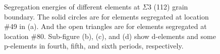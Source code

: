 \begingroup
\begin{figure}[!ht]
  \centering
\caption[Segregation energies of different elements at $\Sigma$3 (112) grain boundary.]{Segregation energies of different elements at $\Sigma$3 (112) grain boundary. The solid circles are for elements segregated at location \#49 in (a). And the open triangles are for elements segregated at location \#80. Sub-figure (b), (c), and (d) show d-elements and some p-elements in fourth, fifth, and sixth periods, respectively.}
\label{Chap:Ag/ZnO:fig18}
\end{figure}
\endgroup

